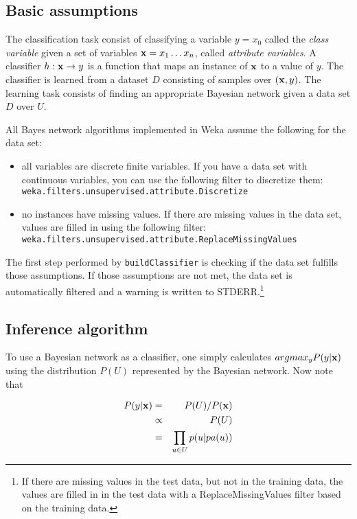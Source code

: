 \subsection*{Basic assumptions}

The classification task consist of classifying a 
variable $y=x_0$ called the {\em class variable} given a set of variables 
${\bf x} = x_1\ldots x_n$, called {\em attribute variables}. 
A classifier $h:{\bf x}\to y$
is a function that maps an instance of $\bf x$ to a value of $y$.
The classifier is learned from a dataset $D$ consisting of samples 
over $({\bf x}, y)$.
%
The learning task consists of finding an appropriate Bayesian network  
given a data set $D$ over $U$.  

All Bayes network algorithms implemented in Weka assume the following
for the data set:
\begin{itemize}
\item all variables are discrete finite variables. If you have a data set
with continuous variables, you can use the following filter to discretize them:\\
{\tt weka.filters.unsupervised.attribute.Discretize} 
\item no instances have missing values. If there are missing values in the
data set, values are filled in using the following filter:\\
{\tt weka.filters.unsupervised.attribute.ReplaceMissingValues}
\end{itemize}

The first step performed by {\tt buildClassifier} is checking if the data set fulfills
those assumptions. If those assumptions are not met, the data set is automatically
filtered and a warning is written to STDERR.\footnote{If there are missing values
in the test data, but not in the training data, the values are filled in in the
test data with a ReplaceMissingValues filter based on the training data.}

\subsection*{Inference algorithm}

To use a Bayesian network as a classifier, one simply calculates $argmax_yP(y|{\bf x})$
using the distribution $P(U)$ represented by the Bayesian network. 
Now note that

\begin{eqnarray}
P(y|{\bf x})&=&P(U)/P({\bf x})\nonumber\\
&\propto& P(U)\nonumber\\
&=&\prod_{u\in U}p(u|pa(u))\label{eq.infer}%
\end{eqnarray}

